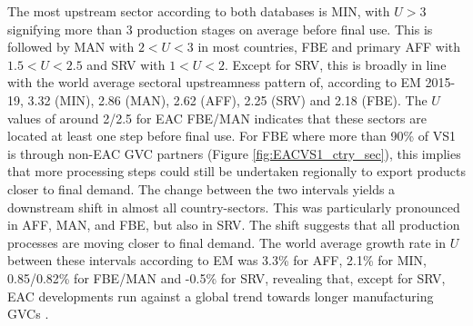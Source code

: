 \documentclass[a4paper]{article}
\begin{document}
 The most upstream sector according to both databases is MIN, with $U>3$ signifying more than 3 production stages on average before final use. This is followed by MAN with $2 <U <3$ in most countries, FBE and primary AFF with $1.5 <U <2.5$ and SRV with $1 <U <2$. Except for SRV, this is broadly in line with the world average sectoral upstreamness pattern of, according to EM 2015-19, 3.32 (MIN), 2.86 (MAN), 2.62 (AFF), 2.25 (SRV) and 2.18 (FBE). The $U$ values of around 2/2.5 for EAC FBE/MAN indicates that these sectors are located at least one step before final use. For FBE where more than 90\% of VS1 is through non-EAC GVC partners (Figure \ref{fig:EACVS1_ctry_sec}), this implies that more processing steps could still be undertaken regionally to export products closer to final demand. The change between the two intervals yields a downstream shift in almost all country-sectors. This was particularly pronounced in AFF, MAN, and FBE, but also in SRV. The shift suggests that all production processes are moving closer to final demand. The world average growth rate in $U$ between these intervals according to EM was 3.3\% for AFF, 2.1\% for MIN, 0.85/0.82\% for FBE/MAN and -0.5\% for SRV, revealing that, except for SRV, EAC developments run against a global trend towards longer manufacturing GVCs \citep{antras2018measurement}. 
\end{document}
